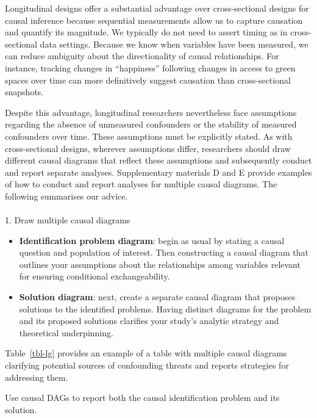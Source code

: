 \documentclass[
  singlecolumn]{article}
\makeatletter
\let\oldparagraph\paragraph
\renewcommand{\paragraph}{
    \@ifstar
      \xxxParagraphStar
      \xxxParagraphNoStar
  }
\newcommand{\xxxParagraphStar}[1]{\oldparagraph*{#1}\mbox{}}
\newcommand{\xxxParagraphNoStar}[1]{\oldparagraph{#1}\mbox{}}
\makeatother
\begin{document}
Longitudinal designs offer a substantial advantage over cross-sectional
designs for causal inference because sequential measurements allow us to
capture causation and quantify its magnitude. We typically do not need
to assert timing as in cross-sectional data settings. Because we know
when variables have been measured, we can reduce ambiguity about the
directionality of causal relationships. For instance, tracking changes
in ``happiness'' following changes in access to green spaces over time
can more definitively suggest causation than cross-sectional snapshots.

Despite this advantage, longitudinal researchers nevertheless face
assumptions regarding the absence of unmeasured confounders or the
stability of measured confounders over time. These assumptions must be
explicitly stated. As with cross-sectional designs, wherever assumptions
differ, researchers should draw different causal diagrams that reflect
these assumptions and subsequently conduct and report separate analyses.
Supplementary materials D and E provide examples of how to conduct and
report analyses for multiple causal diagrams. The following summarises
our advice.

\paragraph{1. Draw multiple causal
diagrams}\label{draw-multiple-causal-diagrams-1}

\begin{itemize}
\item
  \textbf{Identification problem diagram}: begin as usual by stating a
  causal question and population of interest. Then constructing a causal
  diagram that outlines your assumptions about the relationships among
  variables relevant for ensuring conditional exchangeability.
\item
  \textbf{Solution diagram}: next, create a separate causal diagram that
  proposes solutions to the identified problems. Having distinct
  diagrams for the problem and its proposed solutions clarifies your
  study's analytic strategy and theoretical underpinning.
\end{itemize}

Table~\ref{tbl-lg} provides an example of a table with multiple causal
diagrams clarifying potential sources of confounding threats and reports
strategies for addressing them.

\begin{table}

\caption{\label{tbl-lg}Use causal DAGs to report both the causal
identification problem and its solution.}

\centering{

\examplelongitudinal

}

\end{table}%
\end{document}
